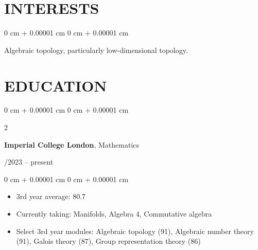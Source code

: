 \documentclass[10pt, letterpaper]{article}
\newenvironment{highlights}{
    \begin{itemize}[
        topsep=0.10 cm,
        parsep=0.10 cm,
        partopsep=0pt,
        itemsep=0pt,
        leftmargin=0 cm + 10pt
    ]
}{
    \end{itemize}
}
\newenvironment{onecolentry}{
    \begin{adjustwidth}{
        0 cm + 0.00001 cm
    }{
        0 cm + 0.00001 cm
    }
}{
    \end{adjustwidth}
}
\newenvironment{twocolentry}[2][]{
    \onecolentry
    \def\secondColumn{#2}
    \setcolumnwidth{\fill, 4.5 cm}
    \begin{paracol}{2}
}{
    \switchcolumn \raggedleft \secondColumn
    \end{paracol}
    \endonecolentry
} %
\begin{document}





    \section{INTERESTS}
    
        \begin{onecolentry}
          Algebraic topology, particularly low-dimensional topology.
        \end{onecolentry}

        \vspace{0.2 cm}

    \section{EDUCATION}



        
        \begin{twocolentry}{
            10/2023 – present
        }
            \textbf{Imperial College London}, Mathematics
        \end{twocolentry}

        \vspace{0.10 cm}
        \begin{onecolentry}
            \begin{highlights}
                \item 3rd year average: 80.7
                \item Currently taking: Manifolds, Algebra 4, Commutative algebra
                \item Select 3rd year modules: Algebraic topology (91), Algebraic number theory (91), Galois theory (87), Group representation theory (86)
            \end{highlights}
        \end{onecolentry}
\end{document}
